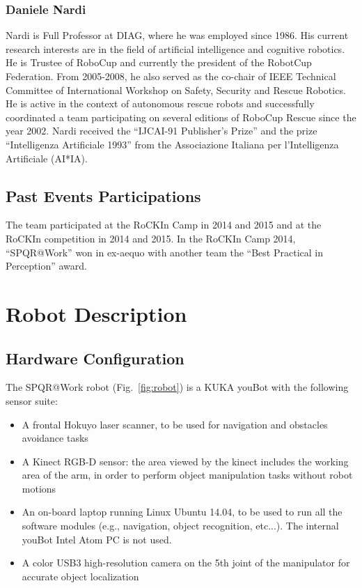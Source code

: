 \documentclass{llncs}
\begin{document}
\subsubsection*{Daniele Nardi}

Nardi is Full Professor at DIAG, where he was employed since 1986. His current research interests are in the field of artificial intelligence and cognitive robotics. He is Trustee of RoboCup and currently the president of the RobotCup Federation.  From 2005-2008, he also served as the co-chair of IEEE Technical Committee of International Workshop on Safety, Security and Rescue Robotics.  He is active in the context of autonomous rescue robots and successfully coordinated a team participating on several editions of RoboCup Rescue since the year 2002.  
Nardi received the ``IJCAI-91 Publisher's Prize'' and the prize ``Intelligenza Artificiale 1993'' from the Associazione Italiana per l'Intelligenza Artificiale (AI*IA).

\subsection{Past Events Participations}

The team participated at the RoCKIn Camp in 2014 and 2015 and at the RoCKIn competition in 2014 and 2015. In the RoCKIn Camp 2014, ``SPQR@Work'' won in ex-aequo with another team the ``Best Practical in Perception'' award.

\section{Robot Description}

\subsection{Hardware Configuration}

The SPQR@Work robot (Fig.~\ref{fig:robot}) is a KUKA youBot with the following sensor suite:

\begin{itemize}
 \item A frontal Hokuyo laser scanner, to be used for navigation and obstacles avoidance tasks
 \item A Kinect RGB-D sensor: the area viewed by the kinect includes the working area of the arm, in order to perform object manipulation tasks without robot motions
 \item An on-board laptop running Linux Ubuntu 14.04, to be used to run all the software modules (e.g., navigation, object recognition, etc...). The internal youBot Intel Atom PC is not used.
 \item A color USB3 high-resolution camera on the 5th joint of the manipulator for accurate object localization
\end{itemize}
\end{document}
